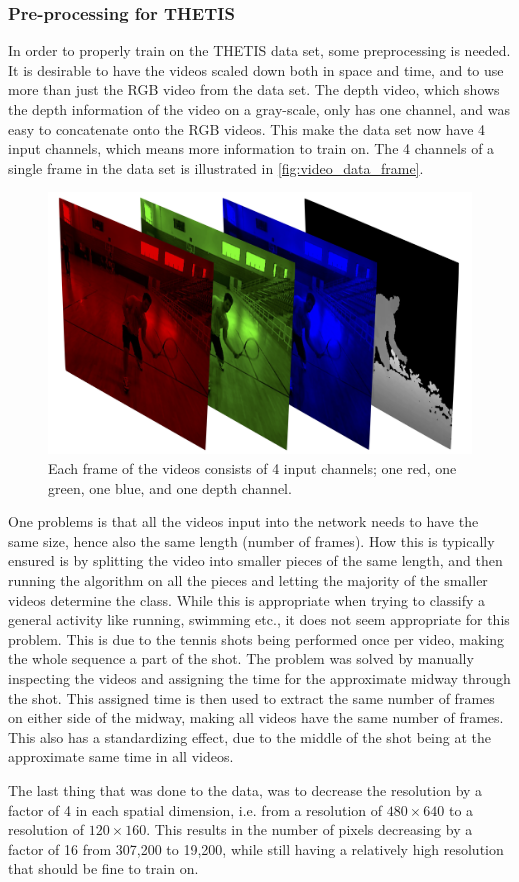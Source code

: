 \subsubsection{Pre-processing for THETIS}
In order to properly train on the THETIS data set, some preprocessing is needed. It is desirable to have the videos scaled down both in space and time, and to use more than just the RGB video from the data set. The depth video, which shows the depth information of the video on a gray-scale, only has one channel, and was easy to concatenate onto the RGB videos. This make the data set now have 4 input channels, which means more information to train on. The 4 channels of a single frame in the data set is illustrated in \autoref{fig:video_data_frame}. 
\begin{figure}
    \centering
    \includegraphics[width=.9\linewidth]{Pics/04_Data/RGBD.png}
    \caption{Each frame of the videos consists of 4 input channels; one red, one green, one blue, and one depth channel.}
    \label{fig:video_data_frame}
\end{figure}

One problems is that all the videos input into the network needs to have the same size, hence also the same length (number of frames). How this is typically ensured is by splitting the video into smaller pieces of the same length, and then running the algorithm on all the pieces and letting the majority of the smaller videos determine the class.\cite{Karpathy2014} While this is appropriate when trying to classify a general activity like running, swimming etc., it does not seem appropriate for this problem. This is due to the tennis shots being performed once per video, making the whole sequence a part of the shot. The problem was solved by manually inspecting the videos and assigning the time for the approximate midway through the shot. This assigned time is then used to extract the same number of frames on either side of the midway, making all videos have the same number of frames. This also has a standardizing effect, due to the middle of the shot being at the approximate same time in all videos.

The last thing that was done to the data, was to decrease the resolution by a factor of 4 in each spatial dimension, i.e. from a resolution of $480\times 640$ to a resolution of $120\times 160$. This results in the number of pixels decreasing by a factor of 16 from 307,200 to 19,200, while still having a relatively high resolution that should be fine to train on.
